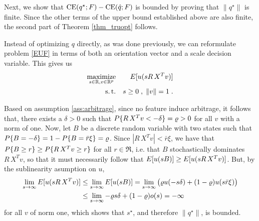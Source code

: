 Next, we show that $\operatorname{CE}(q^\star;F)-\operatorname{CE}({\hat{q}};F)$ is bounded by proving that $\|q^\star\|$ is
finite. Since the other terms of the upper bound established above are also finite, the second part of Theorem
\ref{thm_truopt} follows.


Instead of optimizing $q$ directly, as was done previously, we can reformulate problem \eqref{EUF} in terms of both  an orientation vector and a scale decision variable. This gives us
  \begin{eqnarray*}
    \operatorname*{maximize}_{s\in\mathbb{R},v\in\mathbb{R}^p} && E[ u(s R\,X^T v)] \\
    \operatorname{s.t.}&& s\geq0\;,\;\|v\|=1\;.
  \end{eqnarray*}

Based on assumption \ref{ass:arbitrage}, since no feature induce arbitrage, it follows that,
there exists a $\delta>0$ such that  $P\{R\,X^T v<-\delta\}=\varrho>0$ for all $v$ with a norm of one. Now,
let $B$ be a discrete random variable with two states such that
$P\{B=-\delta\}=1-P\{B=\bar r\xi\}=\varrho$. Since $|R\,X^T v|<\bar r\xi$, we have
that $P\{B\geq r\} \geq P\{R\,X^T v\geq r\}$ for all $r\in\Re$, i.e. that $B$ stochastically dominates $R\,X^T v$, so that 
it must necessarily follow that $E[u(sB)]\geq E[u(sR\,X^T v)]$. But, by the sublinearity asumption on
$u$,
\begin{align*}
  \lim_{s\to\infty}E[u(sR\,X^T v)] &\leq   \lim_{s\to\infty}E[u(sB)]  = \lim_{s\to\infty}\big(\varrho  u(-s\delta)+(1-\varrho)u(s\bar r\xi)\big) \\
  &\leq   \lim_{s\to\infty} -\varrho s\delta + (1-\varrho) o(s) =  -\infty\;
 \end{align*} 
for all $v$ of norm one, which shows that
$s^\star$, and therefore $\|q^\star\|$, is bounded.






